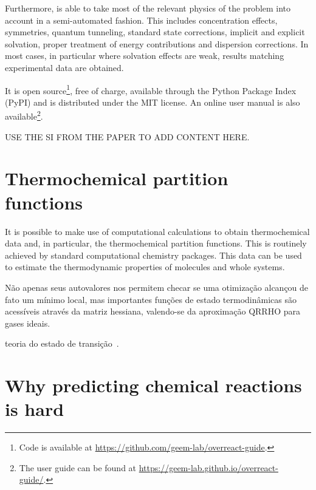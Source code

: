Furthermore,
\overreact is able to take most of the relevant physics of the problem into
account in a semi-automated fashion.
This includes concentration effects,
symmetries,
quantum
tunneling,
standard state corrections,
implicit and explicit solvation,
proper treatment
of energy contributions and dispersion corrections.
In most cases,
in particular where solvation effects are weak,
results matching
experimental data are obtained.

It is open source\footnote{Code is available at
	\url{https://github.com/geem-lab/overreact-guide}.},
free of charge,
available through the Python Package Index (PyPI) and is
distributed under the MIT license.
An online user manual is also
available\footnote{The user guide can be found at \url{https://geem-lab.github.io/overreact-guide/}.}.

USE THE SI FROM THE PAPER TO ADD CONTENT HERE.\@

\section{Thermochemical partition functions}

It is possible to make use of computational calculations to obtain
thermochemical data and,
in particular,
the thermochemical partition
functions.
This is routinely achieved by standard computational chemistry packages.
This data can be used to estimate the thermodynamic properties of molecules and
whole systems.

Não apenas seus autovalores nos permitem checar se uma otimização alcançou de fato um mínimo local,
mas importantes funções de estado termodinâmicas são acessíveis através da matriz hessiana,
valendo-se da aproximação QRRHO para gases ideais.

teoria do estado de transição~\cite{TransitionStateTheory}.

\section{Why predicting chemical reactions is hard}

